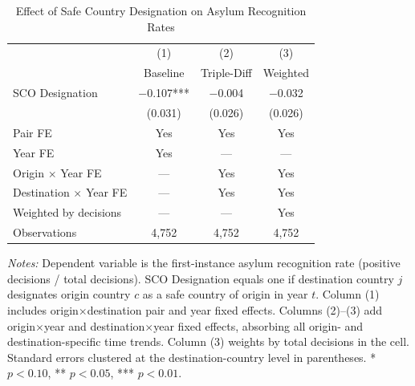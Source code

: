 \begin{table}[H]
\centering
\caption{Effect of Safe Country Designation on Asylum Recognition Rates}
\begin{threeparttable}
\begin{tabular}{lccc}
\toprule
 & (1) & (2) & (3) \\
 & Baseline & Triple-Diff & Weighted \\
\midrule
SCO Designation & $-$0.107*** & $-$0.004 & $-$0.032 \\
 & (0.031) & (0.026) & (0.026) \\[0.5em]
\midrule
Pair FE & Yes & Yes & Yes \\
Year FE & Yes & --- & --- \\
Origin $\times$ Year FE & --- & Yes & Yes \\
Destination $\times$ Year FE & --- & Yes & Yes \\
Weighted by decisions & --- & --- & Yes \\[0.3em]
Observations & 4,752 & 4,752 & 4,752 \\
\bottomrule
\end{tabular}
\begin{tablenotes}[flushleft]
\small
\item \textit{Notes:} Dependent variable is the first-instance asylum recognition rate (positive decisions / total decisions). SCO Designation equals one if destination country $j$ designates origin country $c$ as a safe country of origin in year $t$. Column (1) includes origin$\times$destination pair and year fixed effects. Columns (2)--(3) add origin$\times$year and destination$\times$year fixed effects, absorbing all origin- and destination-specific time trends. Column (3) weights by total decisions in the cell. Standard errors clustered at the destination-country level in parentheses. * $p<0.10$, ** $p<0.05$, *** $p<0.01$.
\end{tablenotes}
\end{threeparttable}
\label{tab:main}
\end{table}
